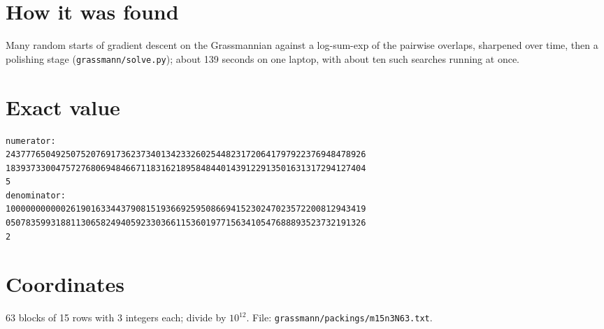 \documentclass[11pt,a4paper]{article}
\begin{document}
\section{How it was found}
Many random starts of gradient descent on the Grassmannian against a log-sum-exp of the pairwise overlaps, sharpened over time, then a polishing stage (\texttt{grassmann/solve.py}); about 139 seconds on one laptop, with about ten such searches running at once.


\appendix
\section{Exact value}
{\small
\begin{verbatim}
numerator:
243777650492507520769173623734013423326025448231720641797922376948478926
183937330047572768069484667118316218958484401439122913501631317294127404
5
denominator:
100000000000261901633443790815193669259508669415230247023572200812943419
050783599318811306582494059233036611536019771563410547688893523732191326
2
\end{verbatim}}

\section{Coordinates}
63 blocks of 15 rows with 3 integers each; divide by $10^{12}$. File: \texttt{grassmann/packings/m15n3N63.txt}.
{\tiny
\begin{multicols}{3}
\end{multicols}}
\end{document}
